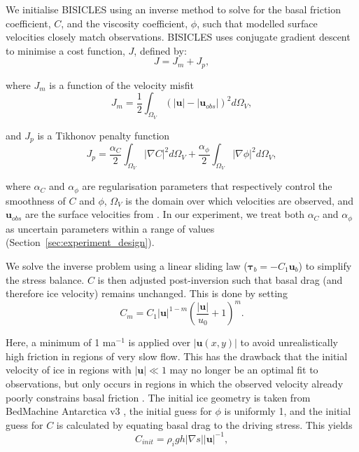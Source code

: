 \documentclass[journal abbreviation, manuscript]{copernicus}
\begin{document}
We initialise BISICLES using an inverse method to solve for the basal friction coefficient, $C$, and the viscosity coefficient, $\phi$, such that modelled surface velocities closely match observations. BISICLES uses conjugate gradient descent \citep{10.5555/865018} to minimise a cost function, $J$, defined by:
\begin{equation}
    J = J_{m} + J_{p},
\end{equation}

\noindent where $J_m$ is a function of the velocity misfit
\begin{equation}
    J_m = \frac{1}{2} \int_{\Omega_V} {\left( |\mathbf{u}| - |\mathbf{u}_{obs}| \right)}^2 d\Omega_V,
    \label{eq:misfit_function}
\end{equation}

\noindent and $J_p$ is a Tikhonov penalty function
\begin{equation}
    J_p = \frac{\alpha_C}{2}  \int_{\Omega_V} {|\nabla C|}^2 d\Omega_V + \frac{\alpha_{\phi}}{2}  \int_{\Omega_V} {|\nabla \phi|}^2 d\Omega_V,
\end{equation}

\noindent where $\alpha_C$ and $\alpha_{\phi}$ are regularisation parameters that respectively control the smoothness of $C$ and $\phi$, $\Omega_V$ is the domain over which velocities are observed, and $\mathbf{u}_{obs}$ are the surface velocities from \citet{rignotMEaSUREsInSARBasedAntarctica2017}. In our experiment, we treat both $\alpha_C$ and $\alpha_{\phi}$ as uncertain parameters within a range of values (Section~\ref{sec:experiment_design}). %

We solve the inverse problem using a linear sliding law ($\bm{\tau}_b = -C_1\mathbf{u}_b$) to simplify the stress balance. $C$ is then adjusted post-inversion such that basal drag (and therefore ice velocity) remains unchanged. This is done by setting
\begin{equation}
    C_{m} = C_1 \lvert \mathbf{u} \rvert^{1-m} \left( \frac{\lvert \mathbf{u} \rvert}{u_0} + 1 \right)^m.
\end{equation}

\noindent Here, a minimum of 1 ma$^{-1}$ is applied over $\lvert \mathbf{u}(x, y) \rvert$ to avoid unrealistically high friction in regions of very slow flow. This has the drawback that the initial velocity of ice in regions with $\lvert \mathbf{u} \rvert \ll 1$ may no longer be an optimal fit to observations, but only occurs in regions in which the observed velocity already poorly constrains basal friction \citep{isaacScalableEfficientAlgorithms2015}. The initial ice geometry is taken from BedMachine Antarctica v3 \citep{morlighemMEaSUREsBedMachineAntarctica2022}, the initial guess for $\phi$ is uniformly 1, and the initial guess for $C$ is calculated by equating basal drag to the driving stress. This yields
\begin{equation}
    C_{init} = \rho_i g h \lvert \nabla s \rvert \lvert \mathbf{u} \rvert^{-1},
\end{equation}
\end{document}
